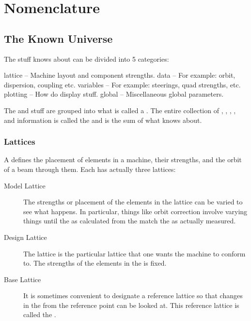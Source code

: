 \chapter{Nomenclature}
\label{c:nomenclature}

\section{The Known Universe}

The stuff \tao knows about can be divided into 5 categories: 
\begin{example}
  lattice   -- Machine layout and component strengths.
  data      -- For example: orbit, dispersion, coupling etc.
  variables -- For example: steerings, quad strengths, etc.
  plotting  -- How do display stuff.
  global    -- Miscellaneous global parameters.
\end{example}
The  and  stuff are grouped into what is called a
. The entire collection of , ,
, , and  information is called
the  and is the sum of what \tao knows about.

\subsection{Lattices}


A  defines the placement of elements in a machine, their
strengths, and the orbit of a beam through them. Each 
has actually three lattices:
  \begin{description}
  \item[Model Lattice]
The strengths or placement of the elements in the  lattice
can be varied to see what happens. In particular, things like orbit
correction involve varying things until the  as calculated
from the  match the  as actually measured.
  \item[Design Lattice] 
The  lattice is the particular lattice that one wants the
machine to conform to. The strengths of the elements in the 
is fixed.
  \item[Base Lattice]
It is sometimes
convenient to designate a reference lattice so that changes in the
 from the reference point can be looked at.  This reference lattice
is called the .
  \end{description}

